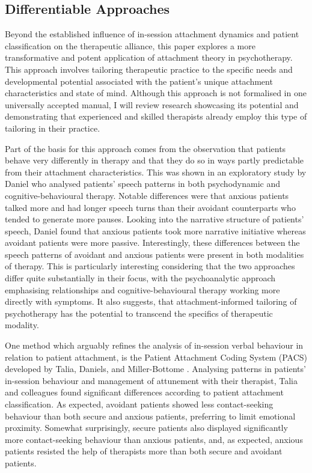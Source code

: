 \documentclass[12pt]{report}
\begin{document}
\subsection{Differentiable Approaches}
\label{sec:Differentiable approaches}
Beyond the established influence of in-session attachment dynamics and patient classification on the therapeutic alliance, this paper explores a more transformative and potent application of attachment theory in psychotherapy.
This approach involves tailoring therapeutic practice to the specific needs and developmental potential associated with the patient's unique attachment characteristics and state of mind.
Although this approach is not formalised in one universally accepted manual, I will review research showcasing its potential and demonstrating that experienced and skilled therapists already employ this type of tailoring in their practice.

Part of the basis for this approach comes from the observation that patients behave very differently in therapy and that they do so in ways partly predictable from their attachment characteristics.
This was shown in an exploratory study by Daniel \citeyear{Daniel2011} who analysed patients' speech patterns in both psychodynamic and cognitive-behavioural therapy.
Notable differences were that anxious patients talked more and had longer speech turns than their avoidant counterparts who tended to generate more pauses.
Looking into the narrative structure of patients' speech, Daniel found that anxious patients took more narrative initiative whereas avoidant patients were more passive.
Interestingly, these differences between the speech patterns of avoidant and anxious patients were present in both modalities of therapy. This is particularly interesting considering that the two approaches differ quite substantially in their focus, with the psychoanalytic approach emphasising relationships and cognitive-behavioural therapy working more directly with symptoms.
It also suggests, that attachment-informed tailoring of psychotherapy has the potential to transcend the specifics of therapeutic modality.

One method which arguably refines the analysis of in-session verbal behaviour in relation to patient attachment, is the Patient Attachment Coding System (PACS) developed by Talia, Daniels, and Miller-Bottome \cite{Talia2014, Talia2017}.
Analysing patterns in patients' in-session behaviour and management of attunement with their therapist, Talia and colleagues \citeyear{Talia2014} found significant differences according to patient attachment classification.
As expected, avoidant patients showed less contact-seeking behaviour than both secure and anxious patients, preferring to limit emotional proximity.
Somewhat surprisingly, secure patients also displayed significantly more contact-seeking behaviour than anxious patients, and, as expected, anxious patients resisted the help of therapists more than both secure and avoidant patients.
\end{document}
